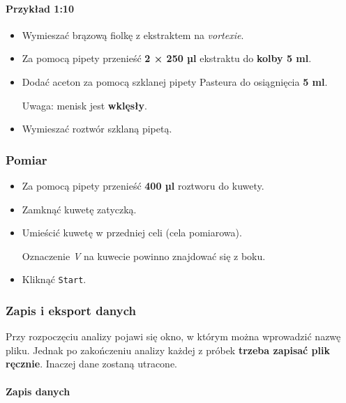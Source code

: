 \documentclass[
  letterpaper,
  DIV=11,
  numbers=noendperiod]{scrreprt}
\let\oldparagraph\paragraph
\renewcommand{\paragraph}[1]{\oldparagraph{#1}\mbox{}}
\begin{document}
\hypertarget{przykux142ad-110}{%
\paragraph{Przykład 1:10}\label{przykux142ad-110}}

\begin{itemize}
\item
  Wymieszać brązową fiolkę z ekstraktem na \emph{vortexie}.
\item
  Za pomocą pipety przenieść \textbf{2 × 250 µl} ekstraktu do
  \textbf{kolby 5 ml}.
\item
  Dodać aceton za pomocą szklanej pipety Pasteura do osiągnięcia
  \textbf{5 ml}.

  Uwaga: menisk jest \textbf{wklęsły}.
\item
  Wymieszać roztwór szklaną pipetą.
\end{itemize}

\hypertarget{pomiar-1}{%
\subsubsection{Pomiar}\label{pomiar-1}}

\begin{itemize}
\item
  Za pomocą pipety przenieść \textbf{400 µl} roztworu do kuwety.
\item
  Zamknąć kuwetę zatyczką.
\item
  Umieścić kuwetę w przedniej celi (cela pomiarowa).

  Oznaczenie \emph{V} na kuwecie powinno znajdować się z boku.
\item
  Kliknąć \texttt{Start}.
\end{itemize}

\hypertarget{zapis-i-eksport-danych}{%
\subsubsection{Zapis i eksport danych}\label{zapis-i-eksport-danych}}

Przy rozpoczęciu analizy pojawi się okno, w którym można wprowadzić
nazwę pliku. Jednak po zakończeniu analizy każdej z próbek
\textbf{trzeba zapisać plik ręcznie}. Inaczej dane zostaną utracone.

\hypertarget{zapis-danych}{%
\paragraph{Zapis danych}\label{zapis-danych}}
\end{document}

